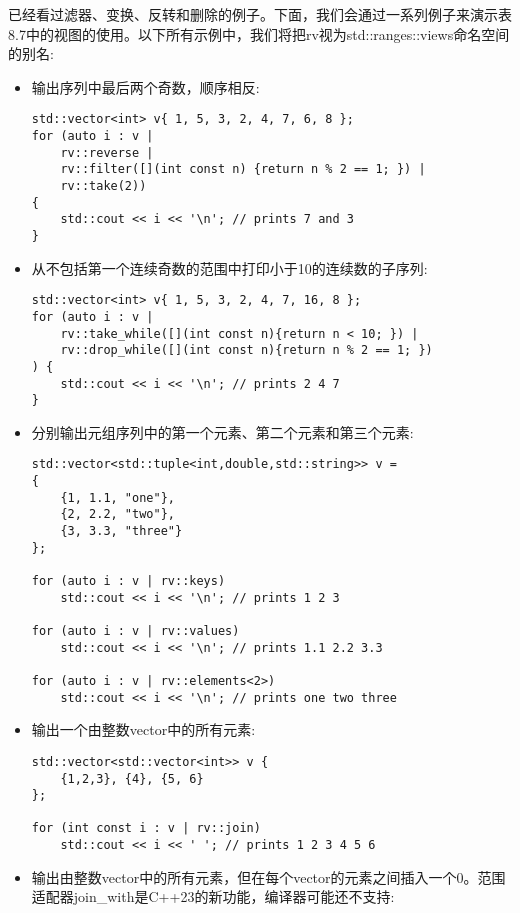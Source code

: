 已经看过滤器、变换、反转和删除的例子。下面，我们会通过一系列例子来演示表8.7中的视图的使用。以下所有示例中，我们将把rv视为std::ranges::views命名空间的别名:

\begin{itemize}
\item
输出序列中最后两个奇数，顺序相反:

\begin{lstlisting}[style=styleCXX]
std::vector<int> v{ 1, 5, 3, 2, 4, 7, 6, 8 };
for (auto i : v |
	rv::reverse |
	rv::filter([](int const n) {return n % 2 == 1; }) |
	rv::take(2))
{
	std::cout << i << '\n'; // prints 7 and 3
}
\end{lstlisting}

\item
从不包括第一个连续奇数的范围中打印小于10的连续数的子序列:

\begin{lstlisting}[style=styleCXX]
std::vector<int> v{ 1, 5, 3, 2, 4, 7, 16, 8 };
for (auto i : v |
	rv::take_while([](int const n){return n < 10; }) |
	rv::drop_while([](int const n){return n % 2 == 1; })
) {
	std::cout << i << '\n'; // prints 2 4 7
}
\end{lstlisting}

\item
分别输出元组序列中的第一个元素、第二个元素和第三个元素:

\begin{lstlisting}[style=styleCXX]
std::vector<std::tuple<int,double,std::string>> v =
{
	{1, 1.1, "one"},
	{2, 2.2, "two"},
	{3, 3.3, "three"}
};

for (auto i : v | rv::keys)
	std::cout << i << '\n'; // prints 1 2 3
	
for (auto i : v | rv::values)
	std::cout << i << '\n'; // prints 1.1 2.2 3.3
	
for (auto i : v | rv::elements<2>)
	std::cout << i << '\n'; // prints one two three
\end{lstlisting}

\item
输出一个由整数vector中的所有元素:

\begin{lstlisting}[style=styleCXX]
std::vector<std::vector<int>> v {
	{1,2,3}, {4}, {5, 6}
};

for (int const i : v | rv::join)
	std::cout << i << ' '; // prints 1 2 3 4 5 6
\end{lstlisting}

\item
输出由整数vector中的所有元素，但在每个vector的元素之间插入一个0。范围适配器join\_with是C++23的新功能，编译器可能还不支持:


\end{itemize}

